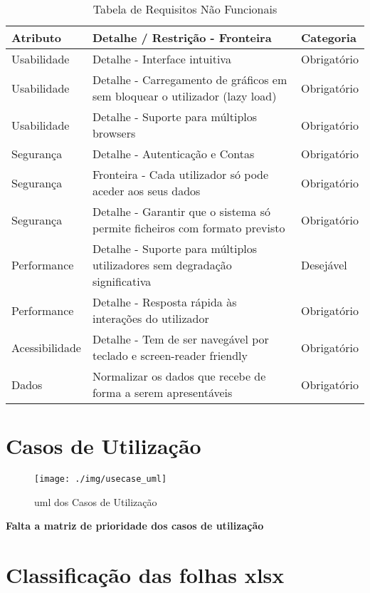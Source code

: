 \begin{table}[h!]
    \centering
    \begin{tabular}{|l|p{7cm}|l|}
    \hline
    \textbf{Atributo} & \textbf{Detalhe / Restrição - Fronteira} & \textbf{Categoria} \\
    \hline
    Usabilidade & Detalhe - Interface intuitiva & Obrigatório \\
    Usabilidade & Detalhe - Carregamento de gráficos em sem bloquear o utilizador (lazy load) & Obrigatório \\
    Usabilidade & Detalhe - Suporte para múltiplos browsers & Obrigatório \\
    Segurança & Detalhe - Autenticação e Contas & Obrigatório \\
    Segurança & Fronteira - Cada utilizador só pode aceder aos seus dados & Obrigatório \\
    Segurança & Detalhe - Garantir que o sistema só permite ficheiros com formato previsto & Obrigatório \\
    Performance & Detalhe - Suporte para múltiplos utilizadores sem degradação significativa & Desejável \\
    Performance & Detalhe - Resposta rápida às interações do utilizador & Obrigatório \\
    Acessibilidade & Detalhe - Tem de ser navegável por teclado e screen-reader friendly & Obrigatório \\
    Dados & Normalizar os dados que recebe de forma a serem apresentáveis & Obrigatório \\

    \hline
    \end{tabular}
    \caption{Tabela de Requisitos Não Funcionais}
    \label{tab:requisitosNaofuncionais}
    \end{table}
    

\chapter{Casos de Utilização}
\label{ch:casosUtilizacao}

\begin{figure}[h]
\centering
\texttt{[image: ./img/usecase\_uml]}
\caption{\gls{uml} dos Casos de Utilização}
\label{fig:umlCasosUtilizacao}
\end{figure}
\textbf{ Falta a matriz de prioridade dos casos de utilização}


\chapter{Classificação das folhas \gls{xlsx}}


